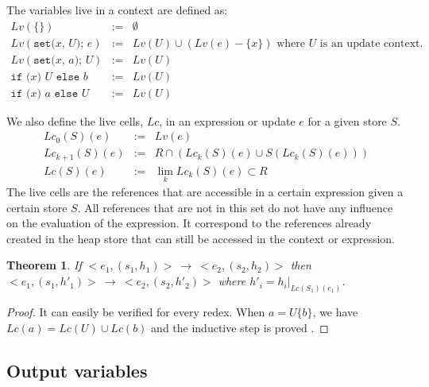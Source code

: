 \documentclass[12pt,a4paper]{article}
\newcommand{\cl}[1]{\texttt{#1}}
\newtheorem{theorem}{Theorem}
\newcommand{\ucont}[1]{\{#1\}}
\begin{document}
The variables live in a context are defined as:
\begin{eqnarray*}
Lv(\ucont{} ) &:=& \emptyset \\
Lv( \cl{set(} x \cl{, } U \cl{); } e ) &:=& Lv(U) \cup \left(Lv(e) - \{ x \} \right) \text{ where $U$ is an update context.} \\
Lv( \cl{set(} x \cl{, } a \cl{); } U ) &:=& Lv(U) \\
\cl{if (} x \cl{) } U \cl{ else } b &:=& Lv(U) \\
\cl{if (} x \cl{) } a \cl{ else } U &:=& Lv(U) 
\end{eqnarray*}


We also define the live cells, $Lc$, in an expression or update $e$ for a given store $S$.
\begin{eqnarray*}
Lc_0(S)(e) &:=& Lv(e) \\
Lc_{k+1}(S)(e) &:=& R \cap (Lc_k(S)(e) \cup S( Lc_k(S)(e) ) ) \\
Lc(S)(e) &:=& \lim_k Lc_k(S)(e) \subset R
\end{eqnarray*}
The live cells are the references that are accessible in a certain expression given a certain store $S$. All references that are not in this set do not have any influence on the evaluation of the expression.
It correspond to the references already created in the heap store that can still be accessed in the context or expression.

\begin{theorem}
If $<e_1, (s_1, h_1)> \ \longrightarrow \ <e_2, (s_2, h_2)>$ then $<e_1, (s_1, h'_1)> \ \longrightarrow \ <e_2, (s_2, h'_2)>$ where $h'_i = h_i|_{Lc(S_1)(e_1)}$.
\end{theorem}
\begin{proof}
It can easily be verified for every redex. When $a = U\ucont{b}$, we have $Lc(a) = Lc(U) \cup Lc(b)$ and the inductive step is proved .
\end{proof}


\subsection{Output variables}
\end{document}
